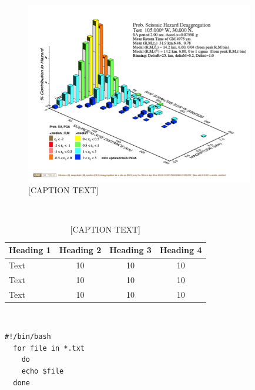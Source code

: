 
\newpage
\hfill \\

\begin{figure}[htbp]
  \centering
  \includegraphics[width=10cm]{figures/Example.png}
  \caption{[CAPTION TEXT]}
  \label{fig:ex1}
\end{figure}


\hfill \\

\begin{table}[htbp]
  \centering
  \begin{tabular}{lccc}
  \hline
  \rowcolor{lightgray}
  \bf{Heading 1} & \bf{Heading 2} & \bf{Heading 3} & \bf{Heading 4} \\
  \hline
  Text & 10 & 10 & 10 \\
  Text & 10 & 10 & 10 \\
  Text & 10 & 10 & 10 \\
  \hline
  \end{tabular}
  \caption{[CAPTION TEXT]}
  \label{tab:tab1}
\end{table}


\hfill \\

\lstset{frameround=fttt}

\begin{lstlisting}[frame=trBL,caption={[CAPTION TEXT]},label=cod1]
  #!/bin/bash
  for file in *.txt
    do
    echo $file
  done
\end{lstlisting}

